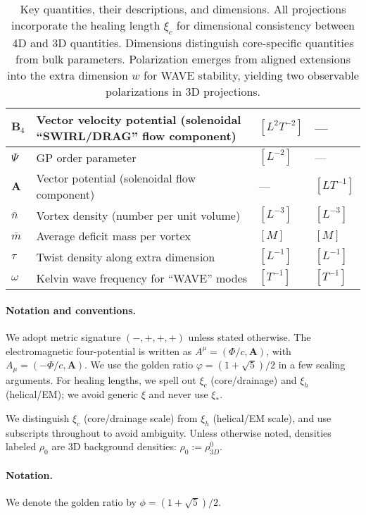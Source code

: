 \begin{table}[H]
\begin{tabularx}{\textwidth}{|l|Y|l|l|}
\hline
$\mathbf{B}_4$ & Vector velocity potential (solenoidal ``SWIRL/DRAG'' flow component) & $[L^2 T^{-2}]$ & --- \\
\hline
$\Psi$ & GP order parameter & $[L^{-2}]$ & --- \\
\hline
$\mathbf{A}$ & Vector potential (solenoidal flow component) & --- & $[L T^{-1}]$ \\
\hline
$\bar{n}$ & Vortex density (number per unit volume) & $[L^{-3}]$ & $[L^{-3}]$ \\
\hline
$\bar{m}$ & Average deficit mass per vortex & $[M]$ & $[M]$ \\
\hline
$\tau$ & Twist density along extra dimension & $[L^{-1}]$ & $[L^{-1}]$ \\
\hline
$\omega$ & Kelvin wave frequency for ``WAVE'' modes & $[T^{-1}]$ & $[T^{-1}]$ \\
\hline
\end{tabularx}
\caption{Key quantities, their descriptions, and dimensions. All projections incorporate the healing length $\xi_c$ for dimensional consistency between 4D and 3D quantities. Dimensions distinguish core-specific quantities from bulk parameters. Polarization emerges from aligned extensions into the extra dimension $w$ for WAVE stability, yielding two observable polarizations in 3D projections.}
\label{tab:notation}
\end{table}
\paragraph{Notation and conventions.}
We adopt metric signature $(-,+,+,+)$ unless stated otherwise.
The electromagnetic four-potential is written as $A^\mu=(\Phi/c,\mathbf A)$, with $A_\mu = (-\Phi/c,\mathbf A)$.
We use the golden ratio $\varphi=(1+\sqrt{5})/2$ in a few scaling arguments.
For healing lengths, we spell out $\xi_c$ (core/drainage) and $\xi_h$ (helical/EM); we avoid generic $\xi$ and never use $\xi_*$.



We distinguish $\xi_c$ (core/drainage scale) from $\xi_h$ (helical/EM scale), and use subscripts throughout to avoid ambiguity. Unless otherwise noted, densities labeled $\rho_0$ are 3D background densities: $\rho_0 := \rho_{3D}^0$.

\paragraph{Notation.} We denote the golden ratio by $\phi=(1+\sqrt{5})/2$.


